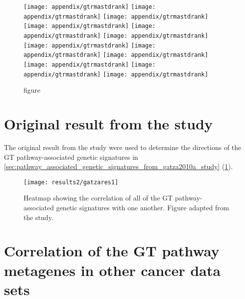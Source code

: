 	\begin{figure}[htpb]
		\ContinuedFloat
		\captionsetup{list=off,format=cont}
		\centering
		\texttt{[image: appendix/gtrmastdrank]}
		\texttt{[image: appendix/gtrmastdrank]}
		\texttt{[image: appendix/gtrmastdrank]}\\
		\texttt{[image: appendix/gtrmastdrank]}
		\texttt{[image: appendix/gtrmastdrank]}
		\texttt{[image: appendix/gtrmastdrank]}\\
		\texttt{[image: appendix/gtrmastdrank]}
		\texttt{[image: appendix/gtrmastdrank]}
		\texttt{[image: appendix/gtrmastdrank]}\\
		\texttt{[image: appendix/gtrmastdrank]}
		\texttt{[image: appendix/gtrmastdrank]}
		\texttt{[image: appendix/gtrmastdrank]}\\
		\caption[]{figure}
	\end{figure}

	\newpage

	\section{Original result from the \citet{Gatza2010a} study}
	\label{sec:result_from_gatza2010a_study}

	The original result from the \citet{Gatza2010a} study were used to determine the directions of the GT pathway-associated genetic signatures in \cref{sec:pathway_associated_genetic_signatures_from_gatza2010a_study} (\cref{fig:gatza_paper_res}).

	\begin{figure}[htpb]
		\centering
		\texttt{[image: results2/gatzares1]}
		\caption[Original result presented in the \citet{Gatza2010a} study]{Heatmap showing the correlation of all of the GT pathway-associated genetic signatures with one another.
		Figure adapted from the \citet{Gatza2010a} study.}
		\label{fig:gatza_paper_res}
	\end{figure}

	\section{Correlation of the GT pathway metagenes in other cancer data sets}
	\label{sec:correlation_of_the_gt_pathway_metagenes_in_other_cancer_data_sets}

